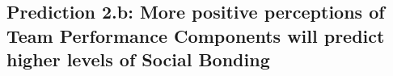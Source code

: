 \begin{CJK}{UTF8}{gbsn}
      \subsection{Prediction 2.b: More positive perceptions of Team Performance Components will predict higher levels of Social Bonding\label{app8:prediction2b}}








\end{CJK}
